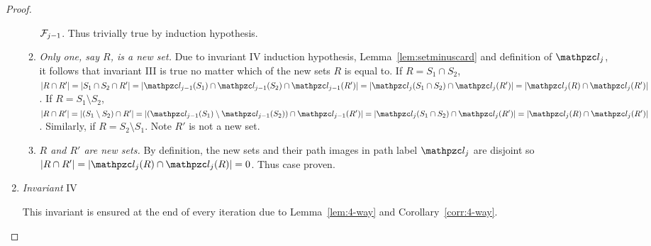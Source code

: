 \begin{proof}
\begin{enumerate}[\xbullet]
\begin{enumerate}[{III}a $|$]
      ${\cal F}_{j-1}$. Thus trivially true by induction hypothesis.
    \item {\em Only one, say $R$, is a new set.} Due to invariant IV
      induction hypothesis, Lemma~\ref{lem:setminuscard} and
      definition of $\cl_j$, it follows that invariant III is true no
      matter which of the new sets $R$ is equal to. If $R = S_1 \cap
      S_2$, $|R \cap R'| = |S_1 \cap S_2 \cap R'| = |\cl_{j-1}(S_1)
      \cap \cl_{j-1}(S_2) \cap \cl_{j-1}(R')| = |\cl_j(S_1 \cap S_2)
      \cap \cl_j(R')| = |\cl_j(R) \cap \cl_j(R')|$.  If $R = S_1
      \setminus S_2$, $|R \cap R'| = |(S_1 \setminus S_2) \cap R'| =
      |(\cl_{j-1}(S_1) \setminus \cl_{j-1}(S_2)) \cap \cl_{j-1}(R')| =
      |\cl_{j}(S_1 \cap S_2) \cap \cl_{j}(R')| = |\cl_{j}(R) \cap
      \cl_{j}(R')|$. Similarly, if $R = S_2 \setminus
      S_1$. Note $R'$ is not a new set.\\

    \item {\em $R$ and $R'$ are new sets.} By definition, the new sets
      and their path images in path label $\cl_j$ are disjoint so $|R
      \cap R'| = |\cl_j(R) \cap \cl_j(R)| = 0$. Thus case proven.
    \end{enumerate}
  \item {\em Invariant} IV

    This invariant is ensured at the end of every iteration due to
    Lemma~\ref{lem:4-way} and Corollary~\ref{corr:4-way}.
  \end{enumerate} 
\end{proof}

